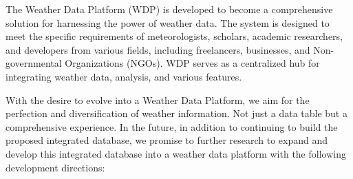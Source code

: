 The Weather Data Platform (WDP) is developed to become a comprehensive solution for harnessing the power of weather data. The system is designed to meet the specific requirements of meteorologists, scholars, academic researchers, and developers from various fields, including freelancers, businesses, and Non-governmental Organizations (NGOs). WDP serves as a centralized hub for integrating weather data, analysis, and various features.

With the desire to evolve into a Weather Data Platform, we aim for the perfection and diversification of weather information. Not just a data table but a comprehensive experience. In the future, in addition to continuing to build the proposed integrated database, we promise to further research to expand and develop this integrated database into a weather data platform with the following development directions:
